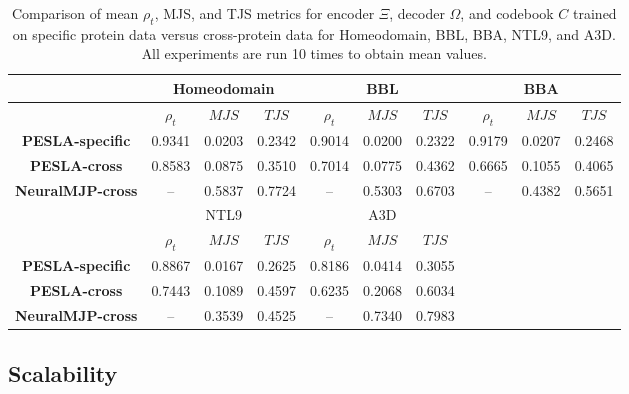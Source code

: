 \begin{table}[!ht]
    \centering
    \caption{Comparison of mean $\rho_t$, MJS, and TJS metrics for encoder $\Xi$, decoder $\Omega$, and codebook $C$ trained on specific protein data versus cross-protein data for Homeodomain, BBL, BBA, NTL9, and A3D. All experiments are run 10 times to obtain mean values.}
    \label{tab:transferability}
    \renewcommand{\arraystretch}{1.2}
    \setlength{\tabcolsep}{3.75pt} %
    \begin{tabular}{c||c|c|c||c|c|c||c|c|c}
        \hline
        & \multicolumn{3}{c||}{Homeodomain} & \multicolumn{3}{c||}{BBL} & \multicolumn{3}{c}{BBA} \\
        \hline
        & $\rho_t$ & $MJS$ & $TJS$ & $\rho_t$ & $MJS$ & $TJS$ & $\rho_t$ & $MJS$ & $TJS$ \\
        \hline
        \textbf{PESLA-specific} & 0.9341 & 0.0203 & 0.2342 & 0.9014 & 0.0200 & 0.2322 & 0.9179 & 0.0207 & 0.2468 \\
        \hline
        \textbf{PESLA-cross} & 0.8583 & 0.0875 & 0.3510 & 0.7014 & 0.0775 & 0.4362 & 0.6665 & 0.1055 & 0.4065 \\
        \textbf{NeuralMJP-cross} & -- & 0.5837 & 0.7724 & -- & 0.5303 & 0.6703 & -- & 0.4382 & 0.5651 \\
        \hline
        & \multicolumn{3}{c||}{NTL9} & \multicolumn{3}{c||}{A3D} \\
        \hline
        & $\rho_t$ & $MJS$ & $TJS$ & $\rho_t$ & $MJS$ & $TJS$ \\
        \hline
        \textbf{PESLA-specific} & 0.8867 & 0.0167 & 0.2625 & 0.8186 & 0.0414 & 0.3055 \\
        \hline
        \textbf{PESLA-cross} & 0.7443 & 0.1089 & 0.4597 & 0.6235 & 0.2068 & 0.6034 \\
        \textbf{NeuralMJP-cross} & -- & 0.3539 & 0.4525 & -- & 0.7340 & 0.7983 \\
        \hline
    \end{tabular}
\end{table}


\subsection{Scalability}

